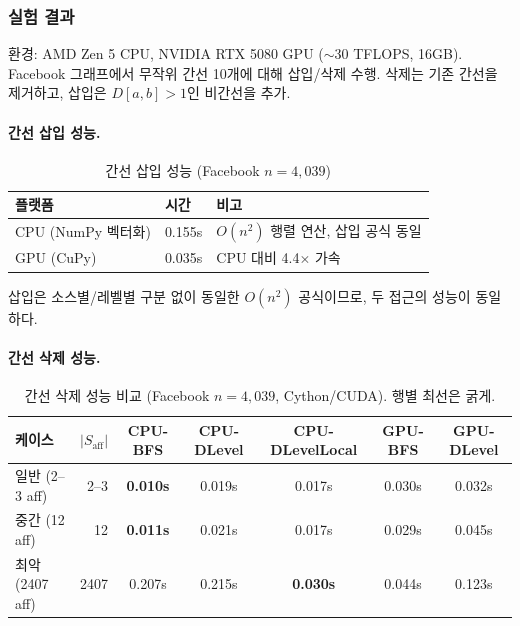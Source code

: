 \documentclass[11pt,a4paper]{article}
\begin{document}
\subsubsection{실험 결과}

환경: AMD Zen 5 CPU, NVIDIA RTX 5080 GPU ($\sim$30 TFLOPS, 16GB). Facebook 그래프에서 무작위 간선 10개에 대해 삽입/삭제 수행. 삭제는 기존 간선을 제거하고, 삽입은 $D[a,b] > 1$인 비간선을 추가.

\paragraph{간선 삽입 성능.}

\begin{table}[H]\centering
\caption{간선 삽입 성능 (Facebook $n=4{,}039$)}
\small
\begin{tabular}{@{}lll@{}}
\toprule
\textbf{플랫폼} & \textbf{시간} & \textbf{비고} \\
\midrule
CPU (NumPy 벡터화) & 0.155s & $O(n^2)$ 행렬 연산, 삽입 공식 동일 \\
GPU (CuPy) & 0.035s & CPU 대비 4.4$\times$ 가속 \\
\bottomrule
\end{tabular}
\end{table}

삽입은 소스별/레벨별 구분 없이 동일한 $O(n^2)$ 공식이므로, 두 접근의 성능이 동일하다.

\paragraph{간선 삭제 성능.}

\begin{table}[H]\centering
\caption{간선 삭제 성능 비교 (Facebook $n=4{,}039$, Cython/CUDA). 행별 최선은 굵게.}
\small
\setlength{\tabcolsep}{4pt}
\begin{tabular}{@{}p{2.3cm}rccccc@{}}
\toprule
\textbf{케이스} & $|S_{\text{aff}}|$ & \textbf{CPU-BFS} & \textbf{CPU-DLevel} & \textbf{CPU-DLevelLocal} & \textbf{GPU-BFS} & \textbf{GPU-DLevel} \\
\midrule
일반 (2--3 aff) & 2--3 & \textbf{0.010s} & 0.019s & 0.017s & 0.030s & 0.032s \\
중간 (12 aff) & 12 & \textbf{0.011s} & 0.021s & 0.017s & 0.029s & 0.045s \\
최악 (2407 aff) & 2407 & 0.207s & 0.215s & \textbf{0.030s} & 0.044s & 0.123s \\
\bottomrule
\end{tabular}
\end{table}
\end{document}
